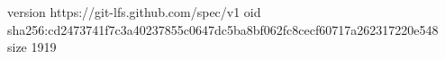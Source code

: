 version https://git-lfs.github.com/spec/v1
oid sha256:cd2473741f7c3a40237855c0647dc5ba8bf062fc8cecf60717a262317220e548
size 1919
